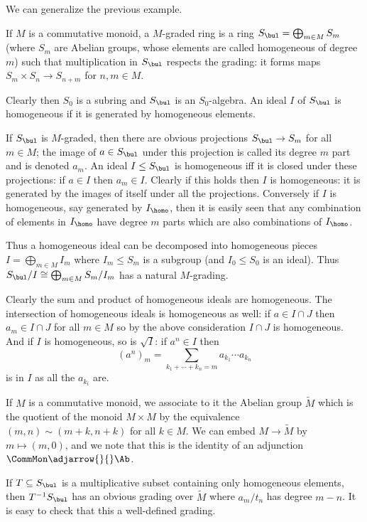 \eexam

We can generalize the previous example.

\bdefn

    If $M$ is a commutative monoid, a {\emphcolor $M$-graded ring} is a ring $S_\bul=\bigoplus_{m\in M}S_m$ (where $S_m$ are
    Abelian groups, whose elements are called {\emphcolor homogeneous of degree $m$}) such that multiplication in $S_\bul$
    respects the grading: it forms maps $S_m\times S_n\to S_{n+m}$ for $n,m\in M$.

    Clearly then $S_0$ is a subring and $S_\bul$ is an $S_0$-algebra.
    An ideal $I$ of $S_\bul$ is {\emphcolor homogeneous} if it is generated by homogeneous elements.

\edefn

If $S_\bul$ is $M$-graded, then there are obvious projections $S_\bul\to S_m$ for all $m\in M$; the image of $a\in S_\bul$
under this projection is called its {\emphcolor degree $m$ part} and is denoted $a_m$.
An ideal $I\leq S_\bul$ is homogeneous iff it is closed under these projections: if $a\in I$ then $a_m\in I$.
Clearly if this holds then $I$ is homogeneous: it is generated by the images of itself under all the projections.
Conversely if $I$ is homogeneous, say generated by $I_\homo$, then it is easily seen that any combination of elements in
$I_\homo$ have degree $m$ parts which are also combinations of $I_\homo$.

Thus a homogeneous ideal can be decomposed into homogeneous pieces $I=\bigoplus_{m\in M}I_m$ where $I_m\leq S_m$ is a subgroup
(and $I_0\leq S_0$ is an ideal).
Thus $S_\bul/I\cong\bigoplus_{m\in M}S_m/I_m$ has a natural $M$-grading.

Clearly the sum and product of homogeneous ideals are homogeneous.
The intersection of homogeneous ideals is homogeneous as well: if $a\in I\cap J$ then $a_m\in I\cap J$ for all $m\in M$
so by the above consideration $I\cap J$ is homogeneous.
And if $I$ is homogeneous, so is $\sqrt I$: if $a^n\in I$ then
$$ (a^n)_m = \sum_{k_1+\cdots+k_n=m}a_{k_1}\cdots a_{k_n} $$
is in $I$ as all the $a_{k_i}$ are.

If $M$ is a commutative monoid, we associate to it the Abelian group $\tilde M$ which is the quotient of the monoid
$M\times M$ by the equivalence $(m,n)\sim(m+k,n+k)$ for all $k\in M$.
We can embed $M\to\tilde M$ by $m\mapsto(m,0)$, and we note that this is the identity of an adjunction
$\CommMon\adjarrow{}{}\Ab$.

If $T\subseteq S_\bul$ is a multiplicative subset containing only homogeneous elements, then $T^{-1}S_\bul$ has an obvious
grading over $\tilde M$ where $a_m/t_n$ has degree $m-n$.
It is easy to check that this a well-defined grading.

